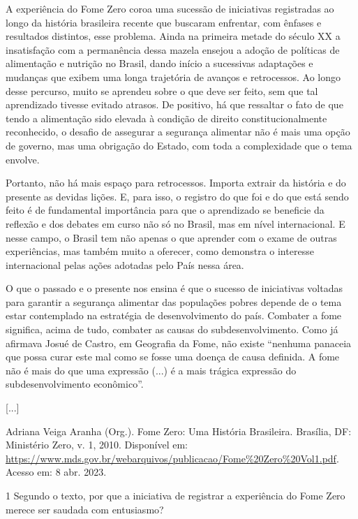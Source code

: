 \begin{itemize}
\begin{itemize}
A experiência do Fome Zero coroa uma sucessão de iniciativas registradas
ao longo da história brasileira recente que buscaram enfrentar, com
ênfases e resultados distintos, esse problema. Ainda na primeira metade
do século XX a insatisfação com a permanência dessa mazela ensejou a
adoção de políticas de alimentação e nutrição no Brasil, dando início a
sucessivas adaptações e mudanças que exibem uma longa trajetória de
avanços e retrocessos. Ao longo desse percurso, muito se aprendeu sobre
o que deve ser feito, sem que tal aprendizado tivesse evitado atrasos.
De positivo, há que ressaltar o fato de que tendo a alimentação sido
elevada à condição de direito constitucionalmente reconhecido, o desafio
de assegurar a segurança alimentar não é mais uma opção de governo, mas
uma obrigação do Estado, com toda a complexidade que o tema envolve.

Portanto, não há mais espaço para retrocessos. Importa extrair da
história e do presente as devidas lições. E, para isso, o registro do
que foi e do que está sendo feito é de fundamental importância para que
o aprendizado se beneficie da reflexão e dos debates em curso não só no
Brasil, mas em nível internacional. E nesse campo, o Brasil tem não
apenas o que aprender com o exame de outras experiências, mas também
muito a oferecer, como demonstra o interesse internacional pelas ações
adotadas pelo País nessa área.

O que o passado e o presente nos ensina é que o sucesso de iniciativas
voltadas para garantir a segurança alimentar das populações pobres
depende de o tema estar contemplado na estratégia de desenvolvimento do
país. Combater a fome significa, acima de tudo, combater as causas do
subdesenvolvimento. Como já afirmava Josué de Castro, em Geografia da
Fome, não existe ``nenhuma panaceia que possa curar este mal como se
fosse uma doença de causa definida. A fome não é mais do que uma
expressão (...) é a mais trágica expressão do subdesenvolvimento
econômico''.

{[}...{]}

Adriana Veiga Aranha (Org.). Fome Zero: Uma História Brasileira.
Brasília, DF: Ministério Zero, v. 1, 2010. Disponível em:
\url{https://www.mds.gov.br/webarquivos/publicacao/Fome\%20Zero\%20Vol1.pdf}.
Acesso em: 8 abr. 2023.

\num{1} Segundo o texto, por que a iniciativa de registrar a experiência
do Fome Zero merece ser saudada com entusiasmo? 


\end{itemize}
\end{itemize}
